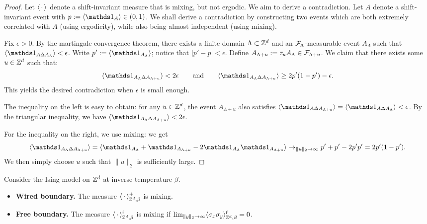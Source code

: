 \begin{proof}
    Let $\langle\,\cdot\,\rangle$ denote a shift-invariant measure that is mixing, but not ergodic.
    We aim to derive a contradiction.
    Let $A$ denote a shift-invariant event with $p:=\langle\ind{A}\rangle\in(0,1)$.
    We shall derive a contradiction by constructing two events which
    are both extremely correlated with $A$ (using ergodicity),
    while also being almost independent (using mixing).

    Fix $\epsilon>0$.
    By the martingale convergence theorem,
    there exists a finite domain $\Lambda\subset\mathbb Z^d$
    and an $\mathcal F_\Lambda$-measurable event
    $A_\Lambda$
    such that
    $\langle \ind{A\Delta A_\Lambda}\rangle<\epsilon$.
    Write $p':=\langle \ind{A_\Lambda}\rangle$;
    notice that $|p'-p|<\epsilon$.
    Define $A_{\Lambda+u}:=\tau_uA_\Lambda\in\mathcal F_{\Lambda+u}$.
    We claim that there exists some $u\in\mathbb Z^d$ such that:
    \[
        \langle \ind{A_\Lambda\Delta A_{\Lambda+u}}\rangle
        <2\epsilon
        \qquad
        \text{and}
        \qquad
        \langle \ind{A_\Lambda\Delta A_{\Lambda+u}}\rangle
        \geq 2p'(1-p')-\epsilon.
    \]
    This yields the desired contradiction when $\epsilon$ is small enough.

    The inequality on the left is easy to obtain:
    for any $u\in\mathbb Z^d$,
    the event $A_{\Lambda+u}$
    also satisfies
    $\langle \ind{A\Delta A_{\Lambda+u}}\rangle=\langle \ind{A\Delta A_\Lambda}\rangle<\epsilon$.
    By the triangular inequality, we have
    \(
        \langle \ind{A_\Lambda\Delta A_{\Lambda+u}}\rangle
        <2\epsilon.
    \)

    For the inequality on the right, we use mixing:
    we get
    \[
        \langle \ind{A_\Lambda\Delta A_{\Lambda+u}}\rangle
        =
        \langle \ind{A_\Lambda}+\ind{A_{\Lambda+u}}
        -
        2 \ind{A_\Lambda}\ind{A_{\Lambda+u}}\rangle
        \to_{\|u\|_2\to\infty}
        p'+p'-2p'p'
        =2p'(1-p').
    \]
    We then simply choose $u$ such that $\|u\|_2$ is sufficiently large.
\end{proof}

\begin{theorem}
    Consider the Ising model on $\mathbb Z^d$ at inverse temperature $\beta$.
    \begin{itemize}
        \item \textbf{Wired boundary.}
        The measure $\langle\,\cdot\,\rangle_{\mathbb Z^d,\beta}^+$ is mixing.
        \item \textbf{Free boundary.}
        The measure $\langle\,\cdot\,\rangle_{\mathbb Z^d,\beta}^{\operatorname{f}}$ is mixing if
        $\lim_{\|y\|_2\to\infty}\langle\sigma_x\sigma_y\rangle_{\mathbb Z^d,\beta}^{\operatorname{f}}=0$.
    \end{itemize}
\end{theorem}

